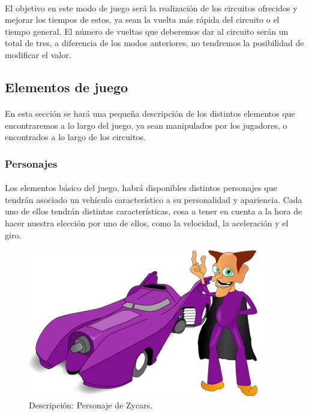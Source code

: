 \paragraph{}
El objetivo en este modo de juego será la realización de los circuitos ofrecidos y mejorar los tiempos de estos, ya sean la 
vuelta más rápida del circuito o el tiempo general. El número de vueltas que deberemos dar al circuito serán un total de tres, a
diferencia de los modos anteriores, no tendremos la posibilidad de modificar el valor.

\subsection{Elementos de juego}

\paragraph{}
En esta sección se hará una pequeña descripción de los distintos elementos que encontraremos a lo largo del juego, ya sean 
manipulados por los jugadores, o encontrados a lo largo de los circuitos.

\subsubsection{Personajes}
	
\paragraph{}
Los elementos básico del juego, habrá disponibles distintos personajes que tendrán asociado un 
vehículo característico a su personalidad y apariencia. Cada uno de ellos
tendrán distintas características, 
cosa a tener en cuenta a la hora de hacer nuestra elección por uno de ellos, como la velocidad, la aceleración y el giro.
	
\begin{figure}[H]
	\label{ejemplo_personaje2}
	\begin{center}
		\includegraphics[scale=0.7]{imagenes/ejemplo_personaje2.png}
	\end{center}
	\caption{Descripción: Personaje de Zycars.}
\end{figure}

